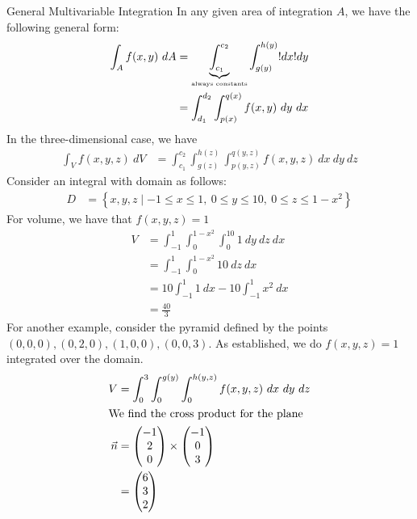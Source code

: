 \documentclass[8pt]{extarticle}
\begin{document}
  \begin{problem}{General Multivariable Integration}
    In any given area of integration $A$, we have the following general form:
    \begin{align*}
      \int_{A}f(x,y)~dA &= \underbrace{\int_{c_1}^{c_2}}_{\text{\tiny always constants}}\int_{g(y)}^{h(y)}!dx!dy\\
                        &= \int_{d_1}^{d_2}\int_{p(x)}^{q(x)}f(x,y)~dy~dx
    \end{align*}
    In the three-dimensional case, we have
    \begin{align*}
      \int_{V}f(x,y,z)~dV &= \int_{c_1}^{c_2}\int_{g(z)}^{h(z)}\int_{p(y,z)}^{q(y,z)}f(x,y,z)~dx~dy~dz
    \end{align*}
    Consider an integral with domain as follows:
    \begin{align*}
      D &= \left\{x,y,z\mid -1\leq x \leq 1,~0\leq y\leq 10,~0\leq z \leq 1-x^2\right\}
    \end{align*}
    For volume, we have that $f(x,y,z) = 1$
    \begin{align*}
      V &= \int_{-1}^{1}\int_{0}^{1-x^2}\int_{0}^{10}1~dy~dz~dx\\
        &= \int_{-1}^{1}\int_{0}^{1-x^2}10~dz~dx\\
        &= 10\int_{-1}^{1}1~dx - 10\int_{-1}^{1}x^2~dx\\
        &= \frac{40}{3}
    \end{align*}
    For another example, consider the pyramid defined by the points $(0,0,0),(0,2,0),(1,0,0),(0,0,3)$. As established, we do $f(x,y,z) = 1$ integrated over the domain. 
    \begin{align*}
      V &= \int_{0}^{3}\int_0^{g(y)}\int_0^{h(y,z)} f(x,y,z)~dx~dy~dz\\
      \shortintertext{We find the cross product for the plane}
      \vec n &= \begin{pmatrix}-1\\2\\0\end{pmatrix}\times \begin{pmatrix}-1\\0\\3\end{pmatrix}\\
             &= \begin{pmatrix}6\\3\\2\end{pmatrix}\\

\end{align*}
\end{problem}
\end{document}
